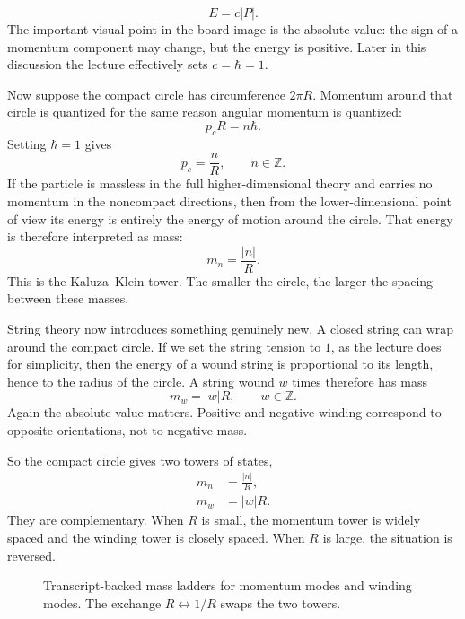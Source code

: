 \begin{equation}
E=c|P|.
\end{equation}
The important visual point in the board image is the absolute value: the sign of a momentum component may change, but the energy is positive. Later in this discussion the lecture effectively sets \(c=\hbar=1\).

Now suppose the compact circle has circumference \(2\pi R\). Momentum around that circle is quantized for the same reason angular momentum is quantized:
\begin{equation}
p_cR=n\hbar.
\end{equation}
Setting \(\hbar=1\) gives
\begin{equation}
p_c=\frac{n}{R}, \qquad n\in\mathbb{Z}.
\end{equation}
If the particle is massless in the full higher-dimensional theory and carries no momentum in the noncompact directions, then from the lower-dimensional point of view its energy is entirely the energy of motion around the circle. That energy is therefore interpreted as mass:
\begin{equation}
m_n=\frac{|n|}{R}.
\end{equation}
This is the Kaluza--Klein tower. The smaller the circle, the larger the spacing between these masses.

String theory now introduces something genuinely new. A closed string can wrap around the compact circle. If we set the string tension to \(1\), as the lecture does for simplicity, then the energy of a wound string is proportional to its length, hence to the radius of the circle. A string wound \(w\) times therefore has mass
\begin{equation}
m_w=|w|R,
\qquad
w\in\mathbb{Z}.
\end{equation}
Again the absolute value matters. Positive and negative winding correspond to opposite orientations, not to negative mass.

So the compact circle gives two towers of states,
\begin{align}
m_n &= \frac{|n|}{R},\\
m_w &= |w|R.
\end{align}
They are complementary. When \(R\) is small, the momentum tower is widely spaced and the winding tower is closely spaced. When \(R\) is large, the situation is reversed.

\begin{figure}[h]
\centering
{}
\caption{Transcript-backed mass ladders for momentum modes and winding modes. The exchange \(R\leftrightarrow 1/R\) swaps the two towers.}
\end{figure}

